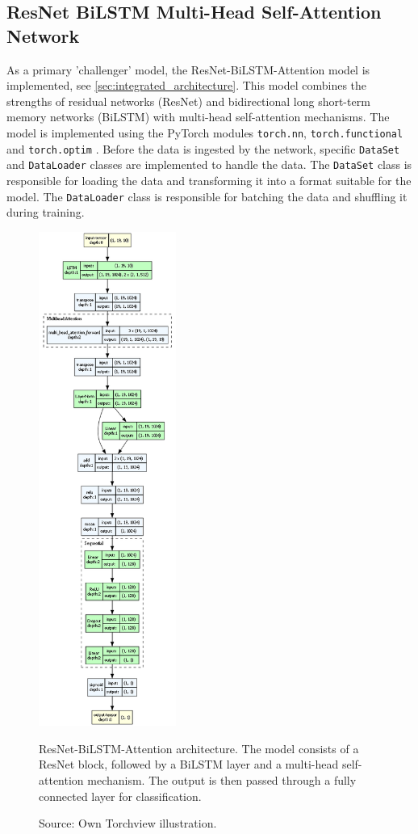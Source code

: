 \subsection{ResNet BiLSTM Multi-Head Self-Attention Network}
As a primary 'challenger' model, the ResNet-BiLSTM-Attention model is implemented, see \autoref{sec:integrated_architecture}. This model combines the strengths of residual networks (ResNet) and bidirectional long short-term memory networks (BiLSTM) with multi-head self-attention mechanisms. The model is implemented using the PyTorch modules \texttt{torch.nn}, \texttt{torch.functional} and \texttt{torch.optim} \autocite{PyTorch}. Before the data is ingested by the network, specific \texttt{DataSet} and \texttt{DataLoader} classes are implemented to handle the data. The \texttt{DataSet} class is responsible for loading the data and transforming it into a format suitable for the model. The \texttt{DataLoader} class is responsible for batching the data and shuffling it during training.

\begin{figure}[htbp]
  \centering
  \includegraphics[width=0.4\textwidth]{figures/architecture.png}
  \caption{ResNet-BiLSTM-Attention architecture. The model consists of a ResNet block, followed by a BiLSTM layer and a multi-head self-attention mechanism. The output is then passed through a fully connected layer for classification.}
  \label{fig:architecture}
  \caption*{Source: Own Torchview illustration.}
\end{figure}

